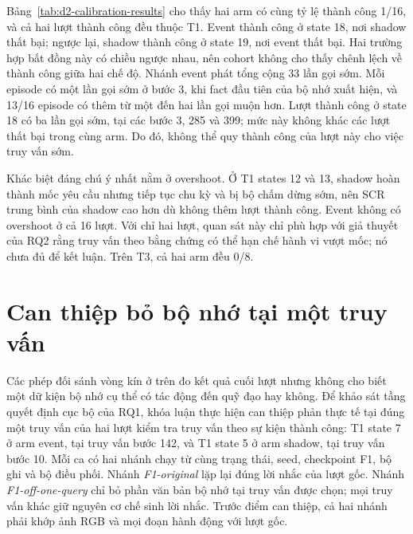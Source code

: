 Bảng~\ref{tab:d2-calibration-results} cho thấy hai arm có cùng tỷ lệ thành công 1/16, và cả hai lượt thành công đều thuộc T1. Event thành công ở state 18, nơi shadow thất bại; ngược lại, shadow thành công ở state 19, nơi event thất bại. Hai trường hợp bất đồng này có chiều ngược nhau, nên cohort không cho thấy chênh lệch về thành công giữa hai chế độ. Nhánh event phát tổng cộng 33 lần gọi sớm. Mỗi episode có một lần gọi sớm ở bước 3, khi fact đầu tiên của bộ nhớ xuất hiện, và 13/16 episode có thêm từ một đến hai lần gọi muộn hơn. Lượt thành công ở state 18 có ba lần gọi sớm, tại các bước 3, 285 và 399; mức này không khác các lượt thất bại trong cùng arm. Do đó, không thể quy thành công của lượt này cho việc truy vấn sớm.

Khác biệt đáng chú ý nhất nằm ở overshoot. Ở T1 states 12 và 13, shadow hoàn thành mốc yêu cầu nhưng tiếp tục chu kỳ và bị bộ chấm dừng sớm, nên SCR trung bình của shadow cao hơn dù không thêm lượt thành công. Event không có overshoot ở cả 16 lượt. Với chỉ hai lượt, quan sát này chỉ phù hợp với giả thuyết của RQ2 rằng truy vấn theo bằng chứng có thể hạn chế hành vi vượt mốc; nó chưa đủ để kết luận. Trên T3, cả hai arm đều 0/8.

\section{Can thiệp bỏ bộ nhớ tại một truy vấn}
\label{sec:e45-one-query}

Các phép đối sánh vòng kín ở trên đo kết quả cuối lượt nhưng không cho biết một dữ kiện bộ nhớ cụ thể có tác động đến quỹ đạo hay không. Để khảo sát tầng quyết định cục bộ của RQ1, khóa luận thực hiện can thiệp phản thực tế tại đúng một truy vấn của hai lượt kiểm tra truy vấn theo sự kiện thành công: T1 state 7 ở arm event, tại truy vấn bước 142, và T1 state 5 ở arm shadow, tại truy vấn bước 10. Mỗi ca có hai nhánh chạy từ cùng trạng thái, seed, checkpoint F1, bộ ghi và bộ điều phối. Nhánh \emph{F1-original} lặp lại đúng lời nhắc của lượt gốc. Nhánh \emph{F1-off-one-query} chỉ bỏ phần văn bản bộ nhớ tại truy vấn được chọn; mọi truy vấn khác giữ nguyên cơ chế sinh lời nhắc. Trước điểm can thiệp, cả hai nhánh phải khớp ảnh RGB và mọi đoạn hành động với lượt gốc.

